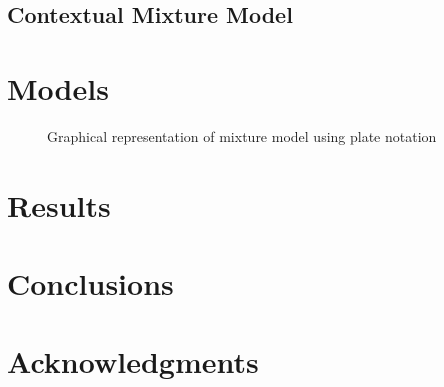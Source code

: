 \documentclass{edm_template}
\begin{document}
\subsection{Contextual Mixture Model}

\section{Models}

\begin{figure}
	\centering
	\caption{\label{fig:mixture_model} Graphical representation of mixture model using plate notation}
\end{figure}


\section{Results}



\section{Conclusions}


\section{Acknowledgments}
\end{document}
